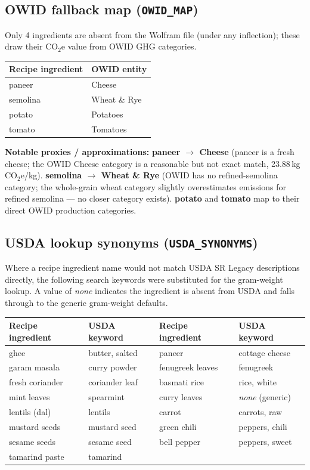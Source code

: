 \documentclass{article}
\begin{document}
\subsection{OWID fallback map (\texttt{OWID\_MAP})}

Only 4 ingredients are absent from the Wolfram file (under any inflection); these draw their CO$_2$e value from OWID GHG categories.

\begin{center}
\begin{tabular}{ll}
\hline
\textbf{Recipe ingredient} & \textbf{OWID entity} \\
\hline
paneer & Cheese \\
semolina & Wheat \& Rye \\
potato & Potatoes \\
tomato & Tomatoes \\
\hline
\end{tabular}
\end{center}

\noindent\textbf{Notable proxies / approximations:} \textbf{paneer $\rightarrow$ Cheese} (paneer is a fresh cheese; the OWID Cheese category is a reasonable but not exact match, 23.88\,kg CO$_2$e/kg). \textbf{semolina $\rightarrow$ Wheat \& Rye} (OWID has no refined-semolina category; the whole-grain wheat category slightly overestimates emissions for refined semolina --- no closer category exists). \textbf{potato} and \textbf{tomato} map to their direct OWID production categories.

\subsection{USDA lookup synonyms (\texttt{USDA\_SYNONYMS})}

Where a recipe ingredient name would not match USDA SR Legacy descriptions directly, the following search keywords were substituted for the gram-weight lookup. A value of \emph{none} indicates the ingredient is absent from USDA and falls through to the generic gram-weight defaults.

\begin{center}
\begin{tabular}{ll|ll}
\hline
\textbf{Recipe ingredient} & \textbf{USDA keyword} & \textbf{Recipe ingredient} & \textbf{USDA keyword} \\
\hline
ghee & butter, salted & paneer & cottage cheese \\
garam masala & curry powder & fenugreek leaves & fenugreek \\
fresh coriander & coriander leaf & basmati rice & rice, white \\
mint leaves & spearmint & curry leaves & \emph{none} (generic) \\
lentils (dal) & lentils & carrot & carrots, raw \\
mustard seeds & mustard seed & green chili & peppers, chili \\
sesame seeds & sesame seed & bell pepper & peppers, sweet \\
tamarind paste & tamarind & & \\
\hline
\end{tabular}
\end{center}
\end{document}
